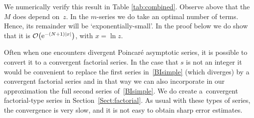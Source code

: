\documentclass[pdftex]{sigma}
\numberwithin{equation}{section}
\def\expe{{\rm e}}
\def\bigO{{\mathcal O}}
\begin{document}
 We numerically verify this result in Table \ref{tab:combined}.
Observe above that the $M$ does depend on~$z$. In the $m$-series we do take an optimal
number of terms. Hence, its remainder will be `exponentially-small'.
In the proof below we do show that it is $\bigO\bigl(\expe^{-(N+1)|x|}\bigr)$,
with $x=\ln z$.

Often when one encounters divergent Poincar\'e asymptotic series, it is possible to convert it
to a convergent factorial series. In the case that $s$ is not an integer it would be convenient
to replace the first series in~\eqref{BIsimple} (which diverges) by a convergent factorial
series and in that way we can also incorporate in our approximation the full second series
of~\eqref{BIsimple}. We do create a~convergent factorial-type series in
Section~\ref{Sect:factorial}. As usual with these types of series, the convergence is very slow, and
it is not easy to obtain sharp error estimates.
\end{document}

